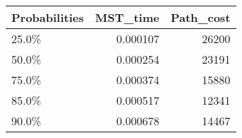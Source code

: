 \begin{tabular}{lrr}
\toprule
Probabilities &  MST\_time &  Path\_cost \\
\midrule
        25.0\% &  0.000107 &      26200 \\
        50.0\% &  0.000254 &      23191 \\
        75.0\% &  0.000374 &      15880 \\
        85.0\% &  0.000517 &      12341 \\
        90.0\% &  0.000678 &      14467 \\
\bottomrule
\end{tabular}
